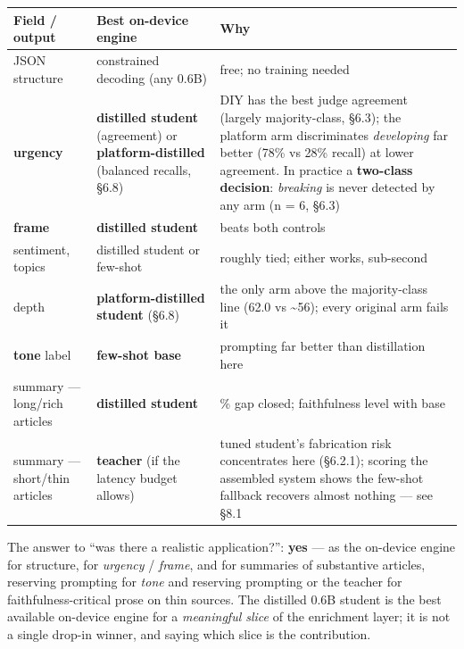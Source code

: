 \documentclass[11pt]{article}
\begin{document}
\begin{longtable}[]{@{}
  >{\raggedright\arraybackslash}p{}
  >{\raggedright\arraybackslash}p{}
  >{\raggedright\arraybackslash}p{}@{}}
\toprule\noalign{}
\begin{minipage}[b]{\linewidth}\raggedright
Field / output
\end{minipage} & \begin{minipage}[b]{\linewidth}\raggedright
Best on-device engine
\end{minipage} & \begin{minipage}[b]{\linewidth}\raggedright
Why
\end{minipage} \\
\midrule\noalign{}
\endhead
\bottomrule\noalign{}
\endlastfoot
JSON structure & constrained decoding (any 0.6B) & free; no training
needed \\
\textbf{urgency} & \textbf{distilled student} (agreement) or
\textbf{platform-distilled} (balanced recalls, §6.8) & DIY has the best
judge agreement (largely majority-class, §6.3); the platform arm
discriminates \emph{developing} far better (78\% vs 28\% recall) at
lower agreement. In practice a \textbf{two-class decision}:
\emph{breaking} is never detected by any arm (n = 6, §6.3) \\
\textbf{frame} & \textbf{distilled student} & beats both controls \\
sentiment, topics & distilled student or few-shot & roughly tied; either
works, sub-second \\
depth & \textbf{platform-distilled student} (§6.8) & the only arm above
the majority-class line (62.0 vs \textasciitilde56); every original arm
fails it \\
\textbf{tone} label & \textbf{few-shot base} & prompting far better than
distillation here \\
summary --- long/rich articles & \textbf{distilled student} & 59\% gap
closed; faithfulness level with base \\
summary --- short/thin articles & \textbf{teacher} (if the latency
budget allows) & tuned student's fabrication risk concentrates here
(§6.2.1); scoring the assembled system shows the few-shot fallback
recovers almost nothing --- see §8.1 \\
\end{longtable}

The answer to ``was there a realistic application?'': \textbf{yes} ---
as the on-device engine for structure, for \emph{urgency} /
\emph{frame}, and for summaries of substantive articles, reserving
prompting for \emph{tone} and reserving prompting or the teacher for
faithfulness-critical prose on thin sources. The distilled 0.6B student
is the best available on-device engine for a \emph{meaningful slice} of
the enrichment layer; it is not a single drop-in winner, and saying
which slice is the contribution.
\end{document}
